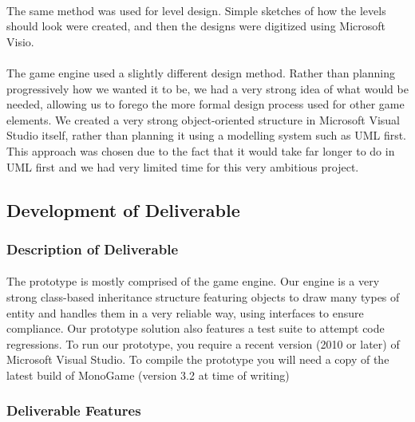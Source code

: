 \documentclass{article}
\begin{document}
\paragraph{}
The same method was used for level design. Simple sketches of how the levels should look were created, and then the designs were digitized using Microsoft Visio. 
\paragraph{}
The game engine used a slightly different design method. Rather than planning progressively how we wanted it to be, we had a very strong idea of what would be needed, allowing us to forego the more formal design process used for other game elements. We created a very strong object-oriented structure in Microsoft Visual Studio itself, rather than planning it using a modelling system such as UML first. This approach was chosen due to the fact that it would take far longer to do in UML first and we had very limited time for this very ambitious project.
\subsection {Development of Deliverable}
\subsubsection{Description of Deliverable}
\paragraph{}
The prototype is mostly comprised of the game engine. Our engine is a very strong class-based inheritance structure featuring objects to draw many types of entity and handles them in a very reliable way, using interfaces to ensure compliance. Our prototype solution also features a test suite to attempt code regressions. To run our prototype, you require a recent version (2010 or later) of Microsoft Visual Studio. To compile the prototype you will need a copy of the latest build of MonoGame (version 3.2 at time of writing) 
\subsubsection{Deliverable Features}
\end{document}
